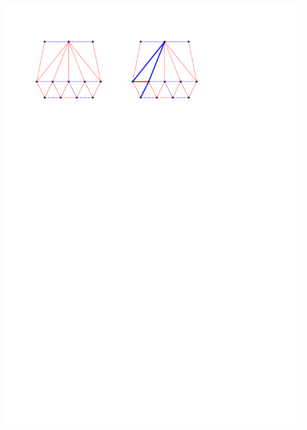 \documentclass[a4paper]{article}
\begin{document}
\includegraphics[width = \textwidth]{topFanFlips/img/split}
\clearpage%
\end{document}

